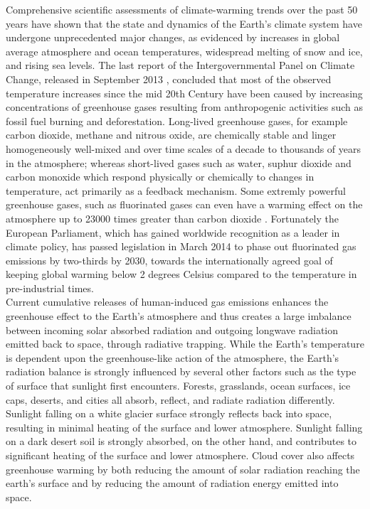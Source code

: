 Comprehensive  scientific assessments  of climate-warming  trends over
the  past 50  years have  shown  that the  state and  dynamics of  the
Earth's climate system have  undergone unprecedented major changes, as
evidenced  by  increases  in   global  average  atmosphere  and  ocean
temperatures,  widespread melting  of  snow and  ice,  and rising  sea
levels.   The last report  of the  Intergovernmental Panel  on Climate
Change, released  in September 2013  \citep{IPCC-2013}, concluded that
most of the observed temperature  increases since the mid 20th Century
have  been caused  by  increasing concentrations  of greenhouse  gases
resulting from  anthropogenic activities  such as fossil  fuel burning
and  deforestation.  Long-lived greenhouse  gases, for  example carbon
dioxide, methane  and nitrous oxide, are chemically  stable and linger
homogeneously well-mixed and over time scales of a decade to thousands
of years in  the atmosphere; whereas short-lived gases  such as water,
suphur  dioxide  and  carbon  monoxide  which  respond  physically  or
chemically  to changes  in temperature,  act primarily  as  a feedback
mechanism.   Some   extremly  powerful  greenhouse   gases,  such  as
fluorinated gases can even have  a warming effect on the atmosphere up
to  23000  times  greater  than  carbon  dioxide  \citep{Zehner-2012}.
Fortunately  the  European  Parliament,  which  has  gained  worldwide
recognition as a  leader in climate policy, has  passed legislation in
March 2014  to phase  out fluorinated gas  emissions by  two-thirds by
2030,  towards  the  internationally  agreed goal  of  keeping  global
warming  below  2  degrees  Celsius  compared to  the  temperature  in
pre-industrial times.\\

\noindent
Current  cumulative releases of  human-induced gas  emissions enhances
the greenhouse  effect to  the Earth's atmosphere  and thus  creates a
large imbalance between incoming solar absorbed radiation and outgoing
longwave radiation emitted back  to space, through radiative trapping.
While the  Earth's temperature  is dependent upon  the greenhouse-like
action of  the atmosphere, the  Earth's radiation balance  is strongly
influenced by several  other factors such as the  type of surface that
sunlight first  encounters.  Forests, grasslands,  ocean surfaces, ice
caps, deserts,  and cities all absorb, reflect,  and radiate radiation
differently.   Sunlight falling  on a  white glacier  surface strongly
reflects back into space, resulting  in minimal heating of the surface
and  lower atmosphere.   Sunlight falling  on  a dark  desert soil  is
strongly absorbed,  on the other hand, and  contributes to significant
heating of the surface and lower atmosphere.  Cloud cover also affects
greenhouse  warming by  both reducing  the amount  of  solar radiation
reaching the earth's  surface and by reducing the  amount of radiation
energy emitted into space.\\

